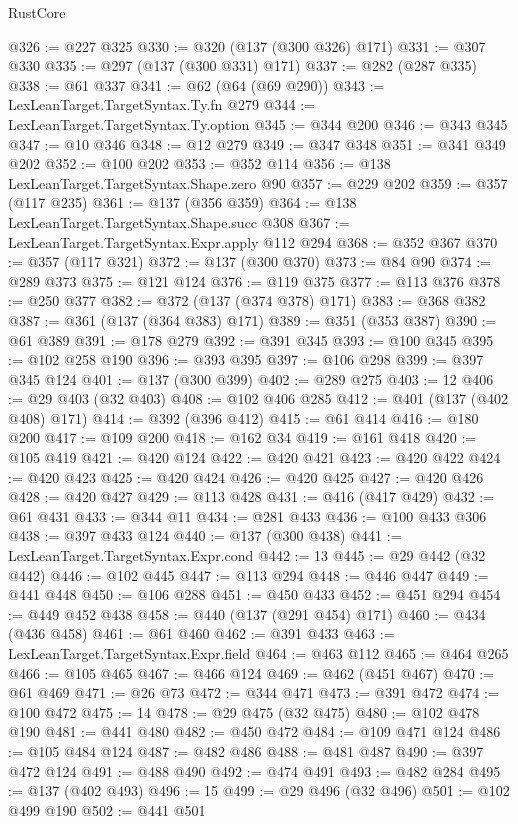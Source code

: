 \begin{lexlean}{RustCore}
\begin{coremodule}
@326 := @227 @325
@330 := @320 (@137 (@300 @326) @171)
@331 := @307 @330
@335 := @297 (@137 (@300 @331) @171)
@337 := @282 (@287 @335)
@338 := @61 @337
@341 := @62 (@64 (@69 @290))
@343 := LexLeanTarget.TargetSyntax.Ty.fn @279
@344 := LexLeanTarget.TargetSyntax.Ty.option
@345 := @344 @200
@346 := @343 @345
@347 := @10 @346
@348 := @12 @279
@349 := @347 @348
@351 := @341 @349 @202
@352 := @100 @202
@353 := @352 @114
@356 := @138 LexLeanTarget.TargetSyntax.Shape.zero @90
@357 := @229 @202
@359 := @357 (@117 @235)
@361 := @137 (@356 @359)
@364 := @138 LexLeanTarget.TargetSyntax.Shape.succ @308
@367 := LexLeanTarget.TargetSyntax.Expr.apply @112 @294
@368 := @352 @367
@370 := @357 (@117 @321)
@372 := @137 (@300 @370)
@373 := @84 @90
@374 := @289 @373
@375 := @121 @124
@376 := @119 @375
@377 := @113 @376
@378 := @250 @377
@382 := @372 (@137 (@374 @378) @171)
@383 := @368 @382
@387 := @361 (@137 (@364 @383) @171)
@389 := @351 (@353 @387)
@390 := @61 @389
@391 := @178 @279
@392 := @391 @345
@393 := @100 @345
@395 := @102 @258 @190
@396 := @393 @395
@397 := @106 @298
@399 := @397 @345 @124
@401 := @137 (@300 @399)
@402 := @289 @275
@403 := 12
@406 := @29 @403 (@32 @403)
@408 := @102 @406 @285
@412 := @401 (@137 (@402 @408) @171)
@414 := @392 (@396 @412)
@415 := @61 @414
@416 := @180 @200
@417 := @109 @200
@418 := @162 @34
@419 := @161 @418
@420 := @105 @419
@421 := @420 @124
@422 := @420 @421
@423 := @420 @422
@424 := @420 @423
@425 := @420 @424
@426 := @420 @425
@427 := @420 @426
@428 := @420 @427
@429 := @113 @428
@431 := @416 (@417 @429)
@432 := @61 @431
@433 := @344 @11
@434 := @281 @433
@436 := @100 @433 @306
@438 := @397 @433 @124
@440 := @137 (@300 @438)
@441 := LexLeanTarget.TargetSyntax.Expr.cond
@442 := 13
@445 := @29 @442 (@32 @442)
@446 := @102 @445
@447 := @113 @294
@448 := @446 @447
@449 := @441 @448
@450 := @106 @288
@451 := @450 @433
@452 := @451 @294
@454 := @449 @452 @438
@458 := @440 (@137 (@291 @454) @171)
@460 := @434 (@436 @458)
@461 := @61 @460
@462 := @391 @433
@463 := LexLeanTarget.TargetSyntax.Expr.field
@464 := @463 @112
@465 := @464 @265
@466 := @105 @465
@467 := @466 @124
@469 := @462 (@451 @467)
@470 := @61 @469
@471 := @26 @73
@472 := @344 @471
@473 := @391 @472
@474 := @100 @472
@475 := 14
@478 := @29 @475 (@32 @475)
@480 := @102 @478 @190
@481 := @441 @480
@482 := @450 @472
@484 := @109 @471 @124
@486 := @105 @484 @124
@487 := @482 @486
@488 := @481 @487
@490 := @397 @472 @124
@491 := @488 @490
@492 := @474 @491
@493 := @482 @284
@495 := @137 (@402 @493)
@496 := 15
@499 := @29 @496 (@32 @496)
@501 := @102 @499 @190
@502 := @441 @501

\end{coremodule}
\end{lexlean}
